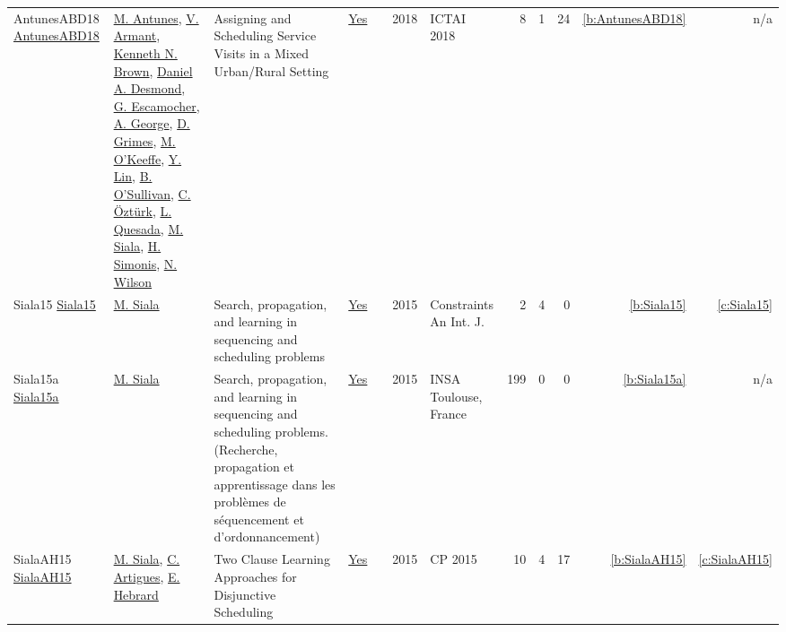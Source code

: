 {\begin{longtable}{>{\raggedright\arraybackslash}p{3cm}>{\raggedright\arraybackslash}p{6cm}>{\raggedright\arraybackslash}p{6.5cm}rrrp{2.5cm}rrrrr}
AntunesABD18 \href{https://doi.org/10.1109/ICTAI.2018.00027}{AntunesABD18} & \hyperref[auth:a884]{M. Antunes}, \hyperref[auth:a885]{V. Armant}, \hyperref[auth:a222]{Kenneth N. Brown}, \hyperref[auth:a886]{Daniel A. Desmond}, \hyperref[auth:a887]{G. Escamocher}, \hyperref[auth:a888]{A. George}, \hyperref[auth:a182]{D. Grimes}, \hyperref[auth:a889]{M. O'Keeffe}, \hyperref[auth:a890]{Y. Lin}, \hyperref[auth:a16]{B. O'Sullivan}, \hyperref[auth:a136]{C. {\"{O}}zt{\"{u}}rk}, \hyperref[auth:a891]{L. Quesada}, \hyperref[auth:a130]{M. Siala}, \hyperref[auth:a17]{H. Simonis}, \hyperref[auth:a832]{N. Wilson} & Assigning and Scheduling Service Visits in a Mixed Urban/Rural Setting & \href{../works/AntunesABD18.pdf}{Yes} & \cite{AntunesABD18} & 2018 & ICTAI 2018 & 8 & 1 & 24 & \ref{b:AntunesABD18} & n/a\\
Siala15 \href{https://doi.org/10.1007/s10601-015-9213-y}{Siala15} & \hyperref[auth:a130]{M. Siala} & Search, propagation, and learning in sequencing and scheduling problems & \href{../works/Siala15.pdf}{Yes} & \cite{Siala15} & 2015 & Constraints An Int. J. & 2 & 4 & 0 & \ref{b:Siala15} & \ref{c:Siala15}\\
Siala15a \href{https://tel.archives-ouvertes.fr/tel-01164291}{Siala15a} & \hyperref[auth:a130]{M. Siala} & Search, propagation, and learning in sequencing and scheduling problems. (Recherche, propagation et apprentissage dans les probl{\`{e}}mes de s{\'{e}}quencement et d'ordonnancement) & \href{../works/Siala15a.pdf}{Yes} & \cite{Siala15a} & 2015 & {INSA} Toulouse, France & 199 & 0 & 0 & \ref{b:Siala15a} & n/a\\
SialaAH15 \href{https://doi.org/10.1007/978-3-319-23219-5_28}{SialaAH15} & \hyperref[auth:a130]{M. Siala}, \hyperref[auth:a6]{C. Artigues}, \hyperref[auth:a1]{E. Hebrard} & Two Clause Learning Approaches for Disjunctive Scheduling & \href{../works/SialaAH15.pdf}{Yes} & \cite{SialaAH15} & 2015 & CP 2015 & 10 & 4 & 17 & \ref{b:SialaAH15} & \ref{c:SialaAH15}\\
\end{longtable}
}

\clearpage

